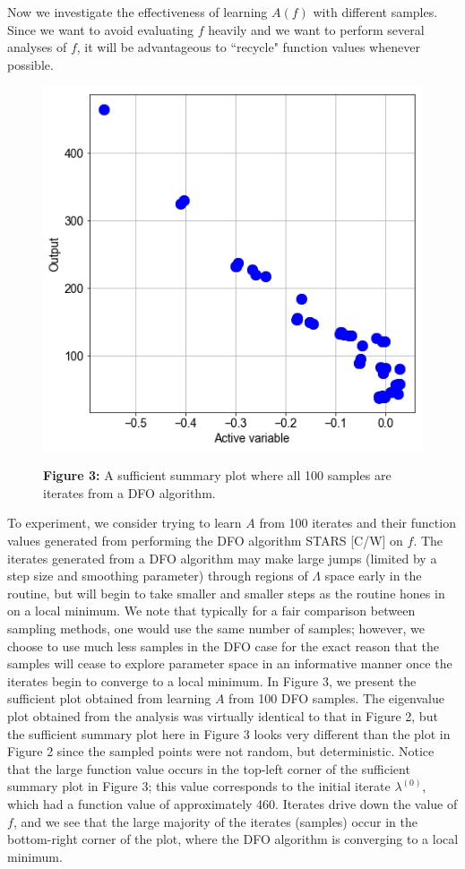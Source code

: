 \documentclass{amsart}
\begin{document}
Now we investigate the effectiveness of learning $A(f)$ with different samples. Since we want to avoid evaluating $f$ heavily and we want to perform several analyses of $f$, it will be advantageous to ``recycle" function values whenever possible. 


\begin{figure} 
\includegraphics[scale=0.3]{suffsum.png}

\textbf{Figure 3:} A sufficient summary plot where all 100 samples are iterates from a DFO algorithm. 
\end{figure} 

To experiment, we consider trying to learn $A$ from 100 iterates and their function values generated from performing the DFO algorithm STARS [C/W] on $f$.  The iterates generated from a DFO algorithm may make large jumps (limited by a step size and smoothing parameter) through regions of $\Lambda$ space early in the routine, but will begin to take smaller and smaller steps as the routine hones in on a local minimum. We note that typically for a fair comparison between sampling methods, one would use the same number of samples; however, we choose to use much less samples in the DFO case for the exact reason that the samples will cease to explore parameter space in an informative manner once the iterates begin to converge to a local minimum. In Figure 3, we present the sufficient plot obtained from learning $A$ from 100 DFO samples. The eigenvalue plot obtained from the analysis was virtually identical to that in Figure 2, but the sufficient summary plot here in Figure 3 looks very different than the plot in Figure 2 since the sampled points were not random, but deterministic. Notice that the large function value occurs in the top-left corner of the sufficient summary plot in Figure 3; this value corresponds to the initial iterate $\lambda^{(0)}$, which had a function value of approximately 460. Iterates drive down the value of $f$, and we see that the large majority of the iterates (samples) occur in the bottom-right corner of the plot, where the DFO algorithm is converging to a local minimum.
\end{document}
